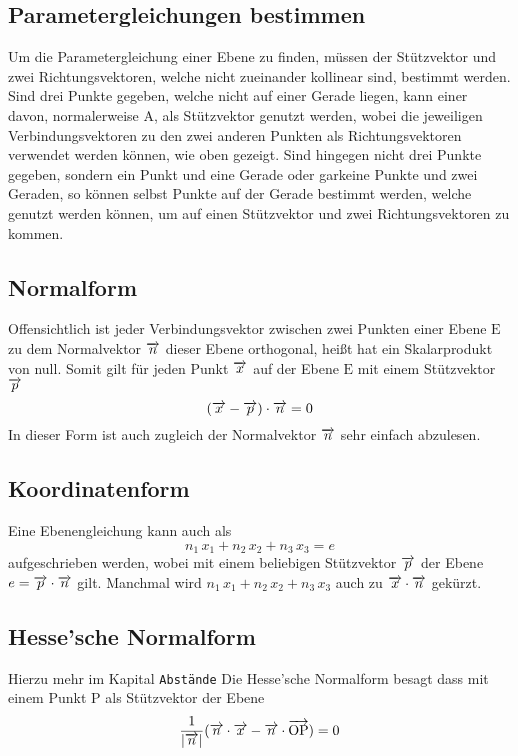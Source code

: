 \documentclass{article}
\begin{document}
\subsection{Parametergleichungen bestimmen}
Um die Parametergleichung einer Ebene zu finden, müssen der Stützvektor und zwei Richtungsvektoren, welche nicht zueinander kollinear sind, bestimmt werden. Sind drei Punkte gegeben, welche nicht auf einer Gerade liegen, kann einer davon, normalerweise $\mathrm{A}$, als Stützvektor genutzt werden, wobei die jeweiligen Verbindungsvektoren zu den zwei anderen Punkten als Richtungsvektoren verwendet werden können, wie oben gezeigt. \newline
Sind hingegen nicht drei Punkte gegeben, sondern ein Punkt und eine Gerade oder garkeine Punkte und zwei Geraden, so können selbst Punkte auf der Gerade bestimmt werden, welche genutzt werden können, um auf einen Stützvektor und zwei Richtungsvektoren zu kommen.
 
\subsection{Normalform}
Offensichtlich ist jeder Verbindungsvektor zwischen zwei Punkten einer Ebene $\mathrm{E}$ zu dem Normalvektor $\overrightarrow{n}$ dieser Ebene orthogonal, heißt hat ein Skalarprodukt von null. Somit gilt für jeden Punkt $\overrightarrow{x}$ auf der Ebene $\mathrm{E}$ mit einem Stützvektor $\overrightarrow{p}$
\[
 (\overrightarrow{x} - \overrightarrow{p}) \cdot \overrightarrow{n} = 0 
\]
In dieser Form ist auch zugleich der Normalvektor $\overrightarrow{n}$ sehr einfach abzulesen. 
 
\subsection{Koordinatenform}
Eine Ebenengleichung kann auch als
\[
 n_1 \, x_1 + n_2 \, x_2 + n_3 \, x_3 = e 
\]
aufgeschrieben werden, wobei mit einem beliebigen Stützvektor $\overrightarrow{p}$ der Ebene $e = \overrightarrow{p} \cdot \overrightarrow{n}$ gilt. Manchmal wird $n_1 \, x_1 + n_2 \, x_2 + n_3 \, x_3$ auch zu $\overrightarrow{x} \cdot \overrightarrow{n}$ gekürzt.
 
\subsection{Hesse'sche Normalform}
Hierzu mehr im Kapital \texttt{Abstände} \newline %
Die Hesse'sche Normalform besagt dass mit einem Punkt $\mathrm{P}$ als Stützvektor der Ebene
\[
 \frac{1}{|\overrightarrow{n}|} (\overrightarrow{n} \cdot \overrightarrow{x} - \overrightarrow{n} \cdot \overrightarrow{\mathrm{OP}}) = 0 
\]  
 
\end{document}
